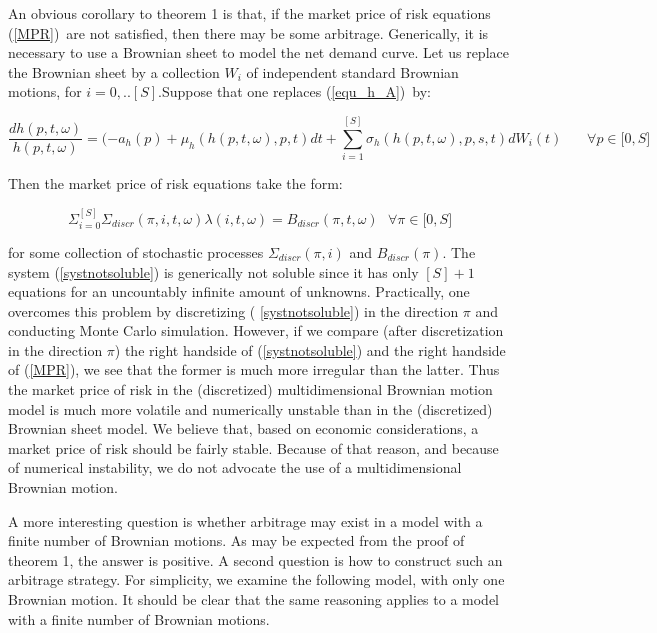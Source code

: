 \documentclass{article}
\begin{document}
An obvious corollary to theorem 1 is that, if the market price of risk
equations (\ref{MPR})\ are not satisfied, then there may be some arbitrage.
Generically, it is necessary to use a Brownian sheet to model the net demand
curve. Let us replace the Brownian sheet by a collection $W_{i}$ of
independent standard Brownian motions, for $i=0,..[S].$Suppose that one
replaces (\ref{equ_h_A})\ by:

\begin{equation*}
\frac{dh(p,t,\omega )}{h(p,t,\omega )}=(-a_{h}(p)+\mu _{h}(h(p,t,\omega
),p,t)dt+\sum_{i=1}^{[S]}\sigma _{h}(h(p,t,\omega ),p,s,t)dW_{i}(t)\ \ \ \ \
\ \ \ \forall p\in \lbrack 0,S]
\end{equation*}

Then the market price of risk equations take the form:

\begin{equation}
\Sigma _{i=0}^{[S]}\Sigma _{discr}(\pi ,i,t,\omega )\lambda (i,t,\omega
)=B_{discr}(\pi ,t,\omega )\text{ \ \ }\forall \pi \in \lbrack 0,S]
\label{systnotsoluble}
\end{equation}

for some collection of stochastic processes $\Sigma _{discr}(\pi ,i)$ and $%
B_{discr}(\pi )$. The system (\ref{systnotsoluble}) is generically not
soluble since it has only $[S]+1$ equations for an uncountably infinite
amount of unknowns. Practically, one overcomes this problem by discretizing (%
\ref{systnotsoluble}) in the direction $\pi $ and conducting Monte Carlo
simulation. However, if we compare (after discretization in the direction $%
\pi $) the right handside of (\ref{systnotsoluble}) and the right handside
of (\ref{MPR}), we see that the former is much more irregular than the
latter. Thus the market price of risk in the (discretized) multidimensional
Brownian motion model is much more volatile and numerically unstable than in
the (discretized) Brownian sheet model. We believe that, based on economic
considerations, a market price of risk should be fairly stable. Because of
that reason, and because of numerical instability, we do not advocate the
use of a multidimensional Brownian motion.

\bigskip

A more interesting question is whether arbitrage may exist in a model with a
finite number of Brownian motions. As may be expected from the proof of
theorem 1, the answer is positive. A second question is how to construct
such an arbitrage strategy. For simplicity, we examine the following model,
with only one Brownian motion. It should be clear that the same reasoning
applies to a model with a finite number of Brownian motions.
\end{document}
